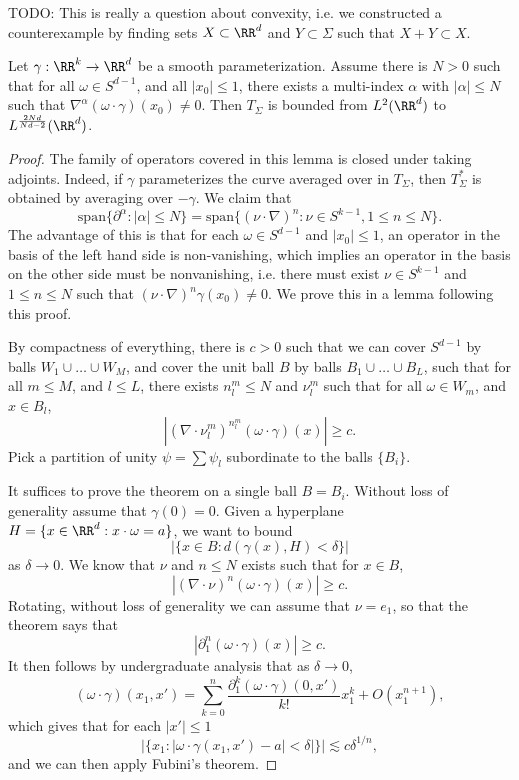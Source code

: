 TODO: This is really a question about convexity, i.e. we constructed a counterexample by finding sets $X \subset \RR^d$ and $Y \subset \Sigma$ such that $X + Y \subset X$.

\begin{theorem}
    Let $\gamma: \RR^k \to \RR^d$ be a smooth parameterization. Assume there is $N > 0$ such that for all $\omega \in S^{d-1}$, and all $|x_0| \leq 1$, there exists a multi-index $\alpha$ with $|\alpha| \leq N$ such that $\nabla^\alpha(\omega \cdot \gamma)(x_0) \neq 0$. Then $T_\Sigma$ is bounded from $L^2(\RR^d)$  to $L^{\frac{2Nd}{Nd-2}}(\RR^d)$.
\end{theorem}
\begin{proof}
    The family of operators covered in this lemma is closed under taking adjoints. Indeed, if $\gamma$ parameterizes the curve averaged over in $T_\Sigma$, then $T_\Sigma^*$ is obtained by averaging over $- \gamma$. We claim that
    \[\text{span} \{ \partial^\alpha : |\alpha| \leq N \} = \text{span} \{ (\nu \cdot \nabla)^n : \nu \in S^{k-1}, 1 \leq n \leq N \}. \]
    The advantage of this is that for each $\omega \in S^{d-1}$ and $|x_0| \leq 1$, an operator in the basis of the left hand side is non-vanishing, which implies an operator in the basis on the other side must be nonvanishing, i.e. there must exist $\nu \in S^{k-1}$ and $1 \leq n \leq N$ such that $(\nu \cdot \nabla)^n \gamma(x_0) \neq 0$. We prove this in a lemma following this proof.

    By compactness of everything, there is $c > 0$ such that we can cover $S^{d-1}$ by balls $W_1 \cup \dots \cup W_M$, and cover the unit ball $B$ by balls $B_1 \cup \dots \cup B_L$, such that for all $m \leq M$, and $l \leq L$, there exists $n^m_l \leq N$ and $\nu^m_l$ such that for all $\omega \in W_m$, and $x \in B_l$,
    \[ |(\nabla \cdot \nu^m_l)^{n^m_l}(\omega \cdot \gamma)(x)| \geq c. \]
    Pick a partition of unity $\psi = \sum \psi_l$ subordinate to the balls $\{ B_i \}$.

    It suffices to prove the theorem on a single ball $B = B_i$. Without loss of generality assume that $\gamma(0) = 0$. Given a hyperplane $H = \{ x \in \RR^d: x \cdot \omega = a \}$, we want to bound
    \[ |\{ x \in B : d(\gamma(x), H) < \delta \}| \]
    as $\delta \to 0$. We know that $\nu$ and $n \leq N$ exists such that for $x \in B$,
    \[ |(\nabla \cdot \nu)^n (\omega \cdot \gamma)(x)| \geq c. \]
    Rotating, without loss of generality we can assume that $\nu = e_1$, so that the theorem says that
    \[ |\partial_1^n (\omega \cdot \gamma)(x)| \geq c. \]
    It then follows by undergraduate analysis that as $\delta \to 0$,
    \[ (\omega \cdot \gamma)(x_1,x') = \sum_{k = 0}^n \frac{\partial_1^k (\omega \cdot \gamma)(0,x')}{k!} x_1^k + O(x_1^{n+1}), \]
    which gives that for each $|x'| \leq 1$
    \[ |\{ x_1: |\omega \cdot \gamma(x_1,x') - a| < \delta| \}| \lesssim c \delta^{1/n}, \]
    and we can then apply Fubini's theorem.


\end{proof}
